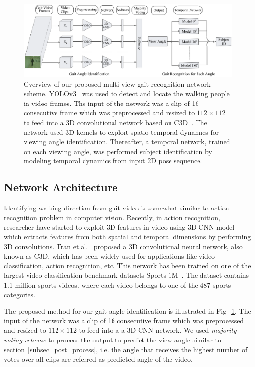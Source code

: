 \begin{figure}
	\centering
	\includegraphics[width=\textwidth]{figures/multi_view_gait_recognition.eps}
	\caption[Overview of our proposed multi-view gait recognition network scheme] 
	{Overview of our proposed multi-view gait recognition network scheme. YOLOv3~\cite{Redmon_18} was used to detect and locate the walking people in video frames. The input of the network was a clip of 16 consecutive frame which was preprocessed and resized to $112\times112$ to feed into a 3D convolutional network based on C3D~\cite{Tran_15}. The network used 3D kernels to exploit spatio-temporal dynamics for viewing angle identification. Thereafter, a temporal network, trained on each viewing angle, was performed subject identification by modeling temporal dynamics from input 2D pose sequence. \label{fig:multi_view_gait_recognition}
	}
	
\end{figure}

\subsection{Network Architecture}
Identifying walking direction from gait video is somewhat similar to action recognition problem in computer vision. Recently, in action recognition, researcher have started to exploit 3D features in video using 3D-CNN model which extracts features from both spatial and temporal dimensions by performing 3D convolutions. Tran et.al.~\cite{Tran_15} proposed a 3D convolutional neural network, also known as C3D, which has been widely used for applications like video classification, action recognition, etc. This network has been trained on one of the largest video classification benchmark datasets Sports-1M~\cite{Karpathy_14}. The dataset contains 1.1 million sports videos, where each video belongs to one of the 487 sports categories. 

The proposed method for our gait angle identification is illustrated in Fig.~\ref{fig:multi_view_gait_recognition}. The input of the network was a clip of 16 consecutive frame which was preprocessed and resized to $112\times112$ to feed into a a 3D-CNN network. We used {\textit {majority voting scheme}} to process the output to predict the view angle similar to section~\ref{subsec_post_process}, i.e. the angle that receives the highest number of votes over all clips are referred as predicted angle of the video.

